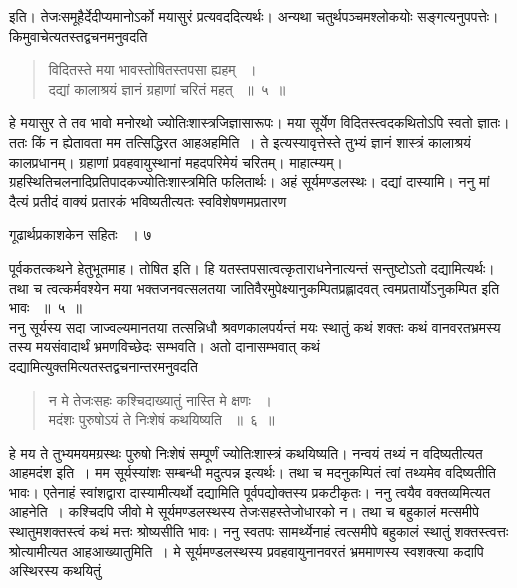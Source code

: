 \documentclass[11pt, openany]{book}
\begin{document}
\begin{sloppypar}
 इति। तेजःसमूहैर्देदीप्यमानोऽर्को मयासुरं प्रत्यवददित्यर्थः। अन्यथा चतुर्थपञ्चमश्लोकयोः सङ्गत्यनुपपत्तेः। किमुवाचेत्यतस्तद्वचनमनुवदति\textendash
\end{sloppypar}


\begin{quote}
 {\ssi विदितस्ते मया भावस्तोषितस्तपसा ह्यहम् ~।\\
दद्यां कालाश्रयं ज्ञानं ग्रहाणां चरितं महत् ~॥~५~॥}
\end{quote}

 हे मयासुर ते तव भावो मनोरथो ज्योतिःशास्त्रजिज्ञासारूपः। मया सूर्येण विदितस्त्वदकथितोऽपि स्वतो ज्ञातः। ततः किं न ह्येतावता मम तत्सिद्धिरत आह\textendash अहमिति~। ते इत्यस्यावृत्तेस्ते तुभ्यं ज्ञानं शास्त्रं कालाश्रयं कालप्रधानम्। ग्रहाणां प्रवहवायुस्थानां महदपरिमेयं चरितम्। माहात्म्यम्। ग्रहस्थितिचलनादिप्रतिपादकज्योतिःशास्त्रमिति फलितार्थः। अहं सूर्यमण्डलस्थः। दद्यां दास्यामि। ननु मां दैत्यं प्रतीदं वाक्यं प्रतारकं भविष्यतीत्यतः स्वविशेषणमप्रतारण\textendash

\newpage

\hspace{3cm} गूढार्थप्रकाशकेन सहितः ~। \hfill ७
\vspace{1cm}

\noindent पूर्वकतत्कथने हेतुभूतमाह। तोषित इति। हि यतस्तपसात्वत्कृताराधनेनात्यन्तं सन्तुष्टोऽतो दद्यामित्यर्थः। तथा च त्वत्कर्मवश्येन मया भक्तजनवत्सलतया जातिवैरमुपेक्ष्यानुकम्पितप्रह्लादवत् त्वमप्रतार्योऽनुकम्पित इति भावः ~॥~५~॥\\
\noindent ननु सूर्यस्य सदा जाज्वल्यमानतया तत्सन्निधौ श्रवणकालपर्यन्तं मयः स्थातुं कथं शक्तः कथं वानवरतभ्रमस्य तस्य मयसंवादार्थं भ्रमणविच्छेदः सम्भवति। अतो दानासम्भवात् कथं दद्यामित्युक्तमित्यतस्तद्वचनान्तरमनुवदति\textendash


\begin{quote}
{\ssi न मे तेजःसहः कश्चिदाख्यातुं नास्ति मे क्षणः ~।\\
मदंशः पुरुषोऽयं ते निःशेषं कथयिष्यति ~॥~६~॥}
\end{quote}
\begin{sloppypar}
 हे मय ते तुभ्यमयमग्रस्थः पुरुषो निःशेषं सम्पूर्णं ज्योतिःशास्त्रं कथयिष्यति। नन्वयं तथ्यं न वदिष्यतीत्यत आह\textendash मदंश इति~। मम सूर्यस्यांशः सम्बन्धी मदुत्पन्न इत्यर्थः। तथा च मदनुकम्पितं त्वां तथ्यमेव वदिष्यतीति भावः। एतेनाहं स्वांशद्वारा दास्यामीत्यर्थो दद्यामिति पूर्वपद्योक्तस्य प्रकटीकृतः। ननु त्वयैव वक्तव्यमित्यत आह\textendash नेति~। कश्चिदपि जीवो मे सूर्यमण्डलस्थस्य तेजःसहस्तेजोधारको न। तथा च बहुकालं मत्समीपे स्थातुमशक्तस्त्वं कथं मत्तः श्रोष्यसीति भावः। ननु स्वतपः सामर्थ्येनाहं त्वत्समीपे बहुकालं स्थातुं शक्तस्त्वत्तः श्रोत्यामीत्यत आह\textendash आख्यातुमिति~। मे सूर्यमण्डलस्थस्य प्रवहवायुनानवरतं भ्रममाणस्य स्वशक्त्या कदापि अस्थिरस्य कथयितुं
\end{sloppypar}
\end{document}

